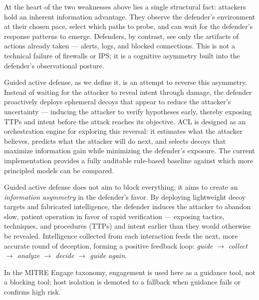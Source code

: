 \documentclass[11pt]{article}
\begin{document}
At the heart of the two weaknesses above lies a single structural fact: attackers hold an inherent information advantage. They observe the defender's environment at their chosen pace, select which paths to probe, and can wait for the defender's response patterns to emerge. Defenders, by contrast, see only the artifacts of actions already taken --- alerts, logs, and blocked connections. This is not a technical failure of firewalls or IPS; it is a cognitive asymmetry built into the defender's observational posture.

Guided active defense, as we define it, is an attempt to reverse this asymmetry. Instead of waiting for the attacker to reveal intent through damage, the defender proactively deploys ephemeral decoys that appear to reduce the attacker's uncertainty --- inducing the attacker to verify hypotheses early, thereby exposing TTPs and intent before the attack reaches its objective. ACL is designed as an orchestration engine for exploring this reversal: it estimates what the attacker believes, predicts what the attacker will do next, and selects decoys that maximize information gain while minimizing the defender's exposure. The current implementation provides a fully auditable rule-based baseline against which more principled models can be compared.

Guided active defense does not aim to block everything; it aims to create an
\textit{information asymmetry} in the defender's favor. By deploying
lightweight decoy targets and fabricated intelligence, the defender induces
the attacker to abandon slow, patient operation in favor of rapid
verification --- exposing tactics, techniques, and procedures (TTPs) and
intent earlier than they would otherwise be revealed. Intelligence collected
from each interaction feeds the next, more accurate round of deception,
forming a positive feedback loop: \textit{guide $\rightarrow$ collect
$\rightarrow$ analyze $\rightarrow$ decide $\rightarrow$ guide again}.

In the MITRE Engage taxonomy, engagement is used here as a guidance tool,
not a blocking tool; host isolation is demoted to a fallback when guidance
fails or confirms high risk.
\end{document}
